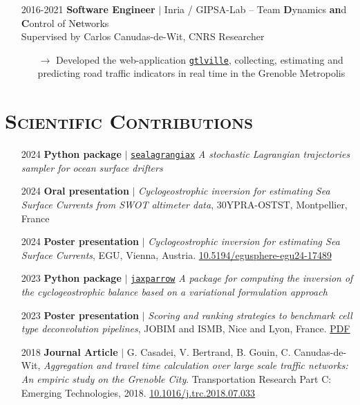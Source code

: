 \documentclass{article}
\begin{document}
\begin{itemize}
    \item[] 2016-2021 \tabto{2cm} \textbf{Software Engineer} $\vert$ Inria / GIPSA-Lab – Team \textbf{D}ynamics \textbf{an}d \textbf{C}ontrol of N\textbf{e}tworks \\[.1 cm]
    \tabto{2cm} Supervised by Carlos Canudas-de-Wit, CNRS Researcher
    \vspace{-.1cm}
    \begin{itemize}[left=2cm]
        \item[$\rightarrow$] Developed the web-application \href{https://gtlville.inrialpes.fr/}{\texttt{gtlville}}, collecting, estimating and predicting road traffic indicators in real time in the Grenoble Metropolis
    \end{itemize}
\end{itemize}

\section*{\textsc{Scientific Contributions}}
\begin{itemize}
    \item[] 2024 \tabto{2cm} \textbf{Python package} $\vert$ \href{https://gitfront.io/r/vadmbertr/9qHVDfXFk3pZ/sealagrangiax/}{\texttt{sealagrangiax}} \textit{A stochastic Lagrangian trajectories sampler for ocean surface drifters}
    
    \item[] 2024 \tabto{2cm} \textbf{Oral presentation} $\vert$ \textit{Cyclogeostrophic inversion for estimating Sea Surface Currents from SWOT altimeter \tabto{2cm} data}, 30YPRA-OSTST, Montpellier, France
    
    \item[] 2024 \tabto{2cm} \textbf{Poster presentation} $\vert$ \textit{Cyclogeostrophic inversion for estimating Sea Surface Currents}, EGU, Vienna, \tabto{2cm} Austria. \href{https://doi.org/10.5194/egusphere-egu24-17489}{10.5194/egusphere-egu24-17489}
    
    \item[] 2023 \tabto{2cm} \textbf{Python package} $\vert$ \href{https://github.com/meom-group/jaxparrow}{\texttt{jaxparrow}} \textit{A package for computing the inversion of the cyclogeostrophic balance based \tabto{2cm} on a variational formulation approach}
    
    \item[] 2023 \tabto{2cm} \textbf{Poster presentation} $\vert$ \textit{Scoring and ranking strategies to benchmark cell type deconvolution pipelines}, \tabto{2cm} JOBIM and ISMB, Nice and Lyon, France. \href{https://vadmbertr.github.io/Exploration-of-joint-deconvolution-algorithms-for-omic-data/poster_jobim_ismb.pdf}{PDF}
    
    \item[] 2018 \tabto{2cm} \textbf{Journal Article} $\vert$ G. Casadei, V. Bertrand, B. Gouin, C. Canudas-de-Wit, \textit{Aggregation and travel time \tabto{2cm} calculation over large scale traffic networks: An empiric study on the Grenoble City}. Transportation \tabto{2cm} Research Part C: Emerging Technologies, 2018. \href{https://doi.org/10.1016/j.trc.2018.07.033}{10.1016/j.trc.2018.07.033}
\end{itemize}
\end{document}
